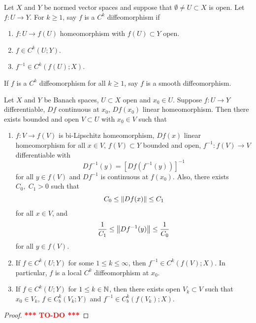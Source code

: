 \documentclass[a4paper]{article}
\newcommand{\TODO}{\textcolor{red}{\textbf{*** TO-DO ***}}}
\begin{document}
\begin{defi}[diffeomorphism]
Let $X$ and $Y$ be normed vector spaces and suppose that 
$\emptyset \neq U \subset X$ is open. 
Let $f : U \to Y$. For $k \geq 1$, say $f$ is a 
$C^k$ diffeomorphism if 
\begin{enumerate}
  \item $f: U \to f(U)$ homeomorphism with $f(U) \subset Y$
  open. 
  \item $f \in C^k(U ; Y)$.
  \item $f^{-1} \in C^k(f(U); X)$.
\end{enumerate}
If $f$ is a $C^k$ diffeomorphism for all $k \geq 1$,
say $f$ is a smooth diffeomorphism.
\end{defi}

\begin{thm}
  Let $X$ and $Y$ be Banach spaces, $U \subset X$ open and 
  $x_0 \in U$. Suppose $f: U \to Y$ differentiable, 
  $Df$ continuous at $x_0$, $Df(x_0)$ linear homeomorphism.
  Then there exists bounded and open $V \subset U$ with 
  $x_0 \in V$ such that 
  \begin{enumerate}
    \item $f: V \to f(V)$ is bi-Lipschitz homeomorphism, 
    $Df(x)$ linear homeomorphism for all $x \in V$, 
    $f(V) \subset Y$ bounded and open, $f^{-1} : f(V) \to V$
    differentiable with 
    \[
    Df^{-1}(y) = [Df(f^{-1}(y))]^{-1}
    \]
    for all $y \in f(V)$ and $Df^{-1}$ is continuous 
    at $f(x_0)$. Also, there exists $C_0, \; C_1 > 0$
    such that 
    \[
    C_0 \leq \left\lVert Df(x)\right\rVert \leq C_1 
    \]
    for all $x \in V$, and 
    \[
    \frac{1}{C_1} \leq \left\lVert Df^{-1}(y)\right\rVert \leq \frac{1}{C_0}
    \]
    for all $y \in f(V)$.
    \item If $f \in C^k(U; Y)$ for some $1 \leq k \leq \infty$,
    then $f^{-1} \in C^k(f(V); X)$. In particular, 
    $f$ is a local $C^k$ diffeomorphism at $x_0$.
    \item If $f \in C^k(U; Y)$ for $1 \leq k \in \mathbb{N}$, then 
    there exists open $V_k \subset V$ such that $x_0 \in V_k$, 
    $f \in C^k_b(V_k ; Y)$ and $f^{-1} \in C^k_b(f(V_k) ; X)$.
  \end{enumerate}
\end{thm}

\begin{proof}
  \TODO
\end{proof}
\end{document}

